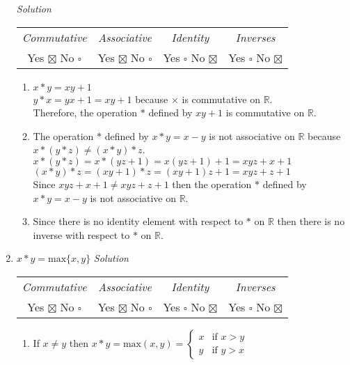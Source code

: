 \documentclass[12pt]{article}
\begin{document}
\begin{flushleft}
\begin{enumerate}
						\medskip
						\textit{Solution}
						\medskip
						\begin{tabular}{c c c c}
							\textit{Commutative} & \textit{Associative} & \textit{Identity} & \textit{Inverses} \\
							Yes $\boxtimes$ No $\square$ & Yes $\boxtimes$ No $\square$ & Yes $\square$ No $\boxtimes$ & Yes $\square$ No $\boxtimes$ \\
						\end{tabular}
						\begin{enumerate}
							\item $x * y  = xy + 1 $ \\
								$y * x = yx + 1 = xy + 1$ because $\times$ is commutative on $\mathbb{R}$. \\
								Therefore, the operation $*$ defined by $xy + 1$ is commutative on $\mathbb{R}$.
							\item The operation $*$ defined by $x * y = x - y$ is not associative on $\mathbb{R}$ because $x * (y * z) \neq (x * y) * z$. \\
								$x * (y * z) = x * (yz + 1) = x(yz + 1) + 1 = xyz + x + 1$ \\
								$(x * y) * z = (xy + 1) * z = (xy + 1)z + 1 = xyz + z + 1$ \\
								Since $xyz + x + 1 \neq xyz + z + 1$ then the operation $*$ defined by $x * y = x - y$ is not associative on $\mathbb{R}$.
							\item Since there is no identity element with respect to $*$ on $\mathbb{R}$ then there is no inverse with respect to $*$ on $\mathbb{R}$.
						\end{enumerate}
					\item $x * y = \text{max}\{x,y\}$
						\medskip
						\textit{Solution}
						\medskip
						\begin{tabular}{c c c c}
							\textit{Commutative} & \textit{Associative} & \textit{Identity} & \textit{Inverses} \\
							Yes $\boxtimes$ No $\square$ & Yes $\boxtimes$ No $\square$ & Yes $\square$ No $\boxtimes$ & Yes $\square$ No $\boxtimes$ \\
						\end{tabular}
						\begin{enumerate}
							\item If $x \neq y$ then $x * y = \text{max}(x,y) = \begin{cases} x &\mbox{if } x > y \\ y &\mbox{if } y > x \end{cases}$ \\

\end{enumerate}
\end{enumerate}
\end{flushleft}
\end{document}
